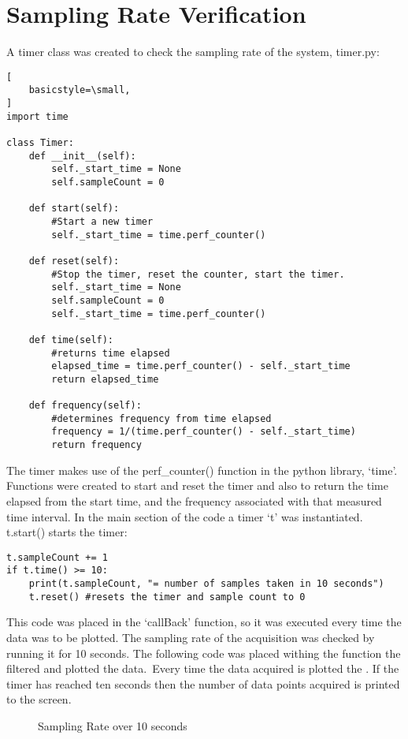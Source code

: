 \documentclass{article}
\begin{document}
\section{Sampling Rate Verification}
A timer class was created to check the sampling rate of the system, timer.py:
\begin{lstlisting}[
    basicstyle=\small,
]
import time

class Timer:
    def __init__(self):
        self._start_time = None
        self.sampleCount = 0

    def start(self):
        #Start a new timer
        self._start_time = time.perf_counter()

    def reset(self):
        #Stop the timer, reset the counter, start the timer.
        self._start_time = None
        self.sampleCount = 0
        self._start_time = time.perf_counter()

    def time(self):
        #returns time elapsed
        elapsed_time = time.perf_counter() - self._start_time
        return elapsed_time
    
    def frequency(self):
        #determines frequency from time elapsed
        frequency = 1/(time.perf_counter() - self._start_time)
        return frequency
\end{lstlisting}
The timer makes use of the perf\_counter() function in the python library, `time'. Functions were created to start and reset the timer and also to return the time elapsed from the start time, and the frequency associated with that measured time interval.
In the main section of the code a timer `t' was instantiated. t.start() starts the timer:
\lstset{language=Python}
\begin{lstlisting}
t.sampleCount += 1
if t.time() >= 10: 
    print(t.sampleCount, "= number of samples taken in 10 seconds")
    t.reset() #resets the timer and sample count to 0
\end{lstlisting}
This code was placed in the `callBack' function, so it was executed every time the data was to be plotted. The sampling rate of the acquisition was checked by running it for 10 seconds. The following code was placed withing the function the filtered and plotted the data.\
Every time the data acquired is plotted the . If the timer has reached ten seconds then the number of data points acquired is printed to the screen.\\
\newline
\begin{figure}[h!]
    \centering
    
    \caption{Sampling Rate over 10 seconds}
    \label{fig:universe}
\end{figure}
\end{document}
